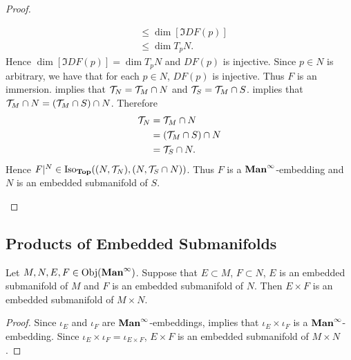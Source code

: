 \documentclass{book}
\begin{document}
\begin{proof}
\begin{itemize}
\begin{align*}
				& \leq \dim [ \Im DF(p)] \\
				& \leq \dim T_pN.
			\end{align*} 
			Hence $\dim [ \Im DF(p)] = \dim T_pN$ and $DF(p)$ is injective. Since $p \in N$ is arbitrary, we have that for each $p \in N$, $DF(p)$ is injective. Thus $F$ is an immersion.  implies that $\mathcal{T}_N = \mathcal{T}_M \cap N$ and $\mathcal{T}_S = \mathcal{T}_M \cap S$.  implies that $\mathcal{T}_M \cap N = (\mathcal{T}_M \cap S) \cap N$. Therefore 
			\begin{align*}
				\mathcal{T}_N
				& = \mathcal{T}_M \cap N \\
				& = (\mathcal{T}_M \cap S) \cap N \\
				& = \mathcal{T}_S \cap N. 
			\end{align*} 
			Hence $F|^N \in \operatorname{Iso}_{\operatorname*{\text{\textbf{Top}}}}((N, \mathcal{T}_N), (N, \mathcal{T}_S \cap N))$. Thus $F$ is a $\operatorname*{\text{\textbf{Man}}^{\infty}}$-embedding and $N$ is an embedded submanifold of $S$.
		\end{itemize}
	\end{proof}
	
	
	
	
	
	
	
	
	
	
	
	
	
	
	
	
	
	
	
	
	
	
	
	\subsection{Products of Embedded Submanifolds}
	
	\begin{ex} 
		Let $M, N, E, F \in \operatorname{Obj}(\operatorname*{\text{\textbf{Man}}^{\infty}})$. Suppose that $E \subset M$, $F \subset N$, $E$ is an embedded submanifold of $M$ and $F$ is an embedded submanifold of $N$. Then $E \times F$ is an embedded submanifold of $M \times N$.
	\end{ex}

	\begin{proof}
		Since $\iota_E$ and $\iota_F$ are $\operatorname*{\text{\textbf{Man}}^{\infty}}$-embeddings,  implies that $\iota_E \times \iota_F$ is a $\operatorname*{\text{\textbf{Man}}^{\infty}}$-embedding. Since $\iota_E \times \iota_F = \iota_{E \times F}$, $E \times F$ is an embedded submanifold of $M \times N$.  
	\end{proof}
	
\end{document}
